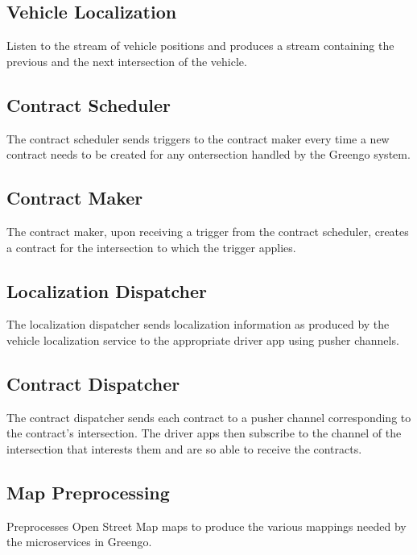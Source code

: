 \documentclass[letterpaper,10pt,english]{sphinxmanual}
\begin{document}
\subsection{Vehicle Localization}
\label{\detokenize{system_architecture:vehicle-localization}}
Listen to the stream of vehicle positions and produces a stream containing the previous and the next intersection of the vehicle.


\subsection{Contract Scheduler}
\label{\detokenize{system_architecture:contract-scheduler}}
The contract scheduler sends triggers to the contract maker every time a new contract needs to be created for any ontersection handled by the Greengo system.


\subsection{Contract Maker}
\label{\detokenize{system_architecture:contract-maker}}
The contract maker, upon receiving a trigger from the contract scheduler, creates a contract for the intersection to which the trigger applies.


\subsection{Localization Dispatcher}
\label{\detokenize{system_architecture:localization-dispatcher}}
The localization dispatcher sends localization information as produced by the vehicle localization service to the appropriate driver app using pusher channels.


\subsection{Contract Dispatcher}
\label{\detokenize{system_architecture:contract-dispatcher}}
The contract dispatcher sends each contract to a pusher channel corresponding to the contract’s intersection.
The driver apps then subscribe to the channel of the intersection that interests them and are so able to receive the contracts.


\subsection{Map Preprocessing}
\label{\detokenize{system_architecture:map-preprocessing}}
Preprocesses Open Street Map maps to produce the various mappings needed by the microservices in Greengo.
\end{document}
